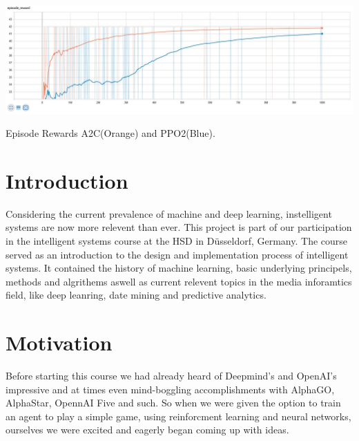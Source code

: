\documentclass[sigconf]{acmart}
\begin{document}
\begin{teaserfigure}
 \includegraphics[width=\textwidth]{episode_reward_big} %
  \caption{Episode Rewards A2C(Orange) and PPO2(Blue).}
  \label{fig:teaser}
\end{teaserfigure}

\maketitle 

\section{Introduction}
Considering the current prevalence of machine and deep learning, instelligent systems are now more relevent than ever.
This project is part of our participation in the intelligent systems course at the HSD in Düsseldorf, Germany. The course served as an introduction to the design and implementation process of intelligent systems. It contained the history of machine learning, basic underlying principels, methods and algrithems aswell as current relevent topics in the media inforamtics field, like deep leanring, date mining and predictive analytics. 
  
\section{Motivation}
Before starting this course we had already heard of Deepmind's and OpenAI's impressive and at times even mind-boggling accomplishments with AlphaGO, AlphaStar, OpennAI Five and such. So when we were given the option to train an agent to play a simple game, using reinforcment learning and neural networks, ourselves we were excited and eagerly began coming up with ideas.
\end{document}
